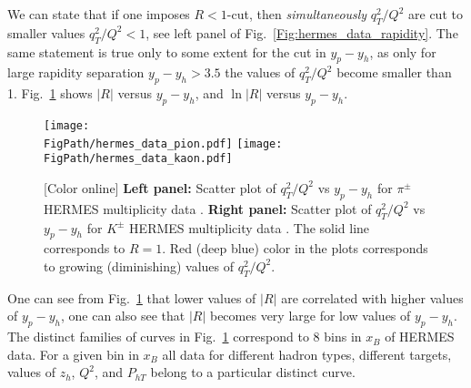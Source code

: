 \documentclass[final,3p,times,onecolumn,sort&compress,hidelinks]{elsarticle}
\newcommand\3[1]{\boldsymbol{#1}}
\newcommand*{\FigPath}{../Figs/}%
\begin{document}
We can state that if one imposes $R<1$-cut, then {\em simultaneously}  $q_T^2/Q^2$ are cut to smaller values $q_T^2/Q^2<1$, see left panel of Fig.~\ref{Fig:hermes_data_rapidity}. The same statement is true only to some extent for the cut in $y_p-y_h$, as only for large rapidity separation $y_p-y_h > 3.5$ the values of $q_T^2/Q^2$ become smaller than 1.  Fig.~\ref{Fig:hermes_data_R} shows $|R|$ versus $y_p-y_h$, and $\ln|R|$ versus $y_p-y_h$.
\begin{figure}[htb!]
\centering
\texttt{[image: \\FigPath/hermes\_data\_pion.pdf]}
\texttt{[image: \\FigPath/hermes\_data\_kaon.pdf]}
\caption{\label{Fig:hermes_data_R}
[Color online] {\bf Left panel:} Scatter plot of $q_T^2/Q^2$ vs $y_p-y_h$ for $\pi^\pm$ HERMES multiplicity data . {\bf Right panel:} 
Scatter plot of $q_T^2/Q^2$ vs $y_p-y_h$ for $K^\pm$ HERMES multiplicity data . The solid line corresponds to $R=1$. Red (deep blue) color in the plots corresponds to growing (diminishing) values of $q_T^2/Q^2$.
}
\end{figure}
One can see from Fig.~\ref{Fig:hermes_data_R} that lower values of $|R|$ are correlated with higher values of $y_p-y_h$, one can also see that $|R|$ becomes very large for low values of $y_p-y_h$. The distinct families of curves in Fig.~\ref{Fig:hermes_data_R} correspond to 8 bins in $x_B$ of HERMES data. For a given bin in $x_B$ all data for different hadron types, different targets, values of $z_h$, $Q^2$, and $P_{hT}$ belong to a particular distinct curve.
\end{document}
